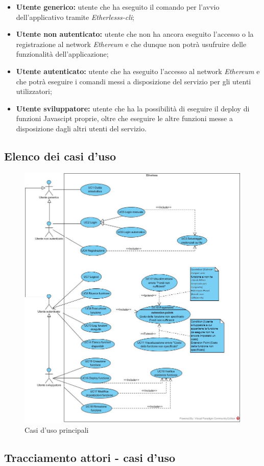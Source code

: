 \begin{itemize}
	\item \textbf{Utente generico:} utente che ha eseguito il comando per l'avvio dell'applicativo tramite \textit{Etherlesss-cli};
	\item \textbf{Utente non autenticato:} utente che non ha ancora eseguito l'accesso o la registrazione al network \textit{Ethereum\glo} e che dunque non potrà usufruire delle funzionalità dell'applicazione;
	\item \textbf{Utente autenticato:} utente che ha eseguito l'accesso al network \textit{Ethereum\glo} e che potrà eseguire i comandi messi a disposizione del servizio per gli utenti utilizzatori;
	\item \textbf{Utente sviluppatore:} utente che ha la possibilità di eseguire il deploy di funzioni Javascipt proprie, oltre che eseguire le altre funzioni messe a disposizione dagli altri utenti del servizio.
\end{itemize}



\subsection{Elenco dei casi d'uso}

\begin{figure}[h]
	\centering
	\includegraphics[width=12.3cm]{res/img/useCaseDiagram.jpg}
	\caption{Casi d'uso principali}
\end{figure}
\newpage

















\subsection{Tracciamento attori - casi d'uso}	